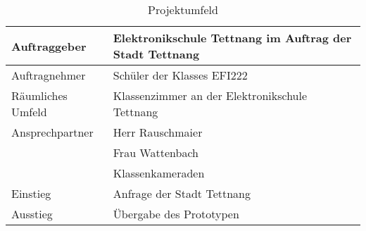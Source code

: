 \begin{table} [h]
	\caption{Projektumfeld}
	\begin{tabular}{|l|l|}
		\hline
		Auftraggeber & Elektronikschule Tettnang im Auftrag der Stadt Tettnang \\
		\hline
		Auftragnehmer & Schüler der Klasses EFI222 \\
		\hline
		Räumliches Umfeld & Klassenzimmer an der Elektronikschule Tettnang \\
		\hline
		Ansprechpartner & Herr Rauschmaier \\
		& Frau Wattenbach \\
		& Klassenkameraden \\
		\hline
		Einstieg & Anfrage der Stadt Tettnang \\
		\hline
		Ausstieg & Übergabe des Prototypen \\
		\hline
	\end{tabular}
\end{table}